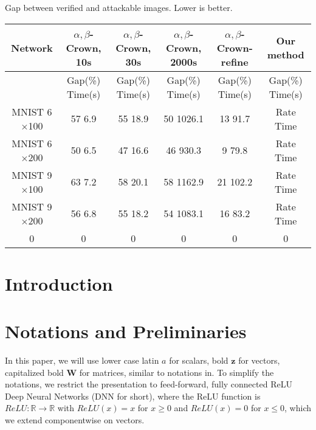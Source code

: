 \documentclass{article} %
\theoremstyle{definition}
\begin{document}
\vspace*{4ex}

Gap between verified and attackable images. Lower is better.

\begin{tabular}{|c|c|c|c|c|c|}
	\hline
	Network & $\alpha,\beta$-Crown, 10s & $\alpha,\beta$-Crown, 30s & $\alpha,\beta$-Crown, 2000s & $\alpha,\beta$-Crown-refine & Our method \\ \hline
	& Gap(\%) \hfill Time(s) & Gap(\%) \hfill Time(s) & Gap(\%) \hfill Time(s) & Gap(\%) \hfill Time(s) & Gap(\%) \hfill Time(s)\\ \hline
	MNIST 6$\times$100 & 57 \hfill 6.9 & 55 \hfill 18.9 & 50 \hfill 1026.1 & 13 \hfill 91.7 & Rate \hfill Time \\ \hline
	MNIST 6$\times$200 & 50 \hfill 6.5 & 47 \hfill 16.6 & 46 \hfill 930.3 & 9 \hfill 79.8 & Rate \hfill Time \\ \hline
	MNIST 9$\times$100 & 63 \hfill 7.2 & 58 \hfill 20.1 & 58 \hfill 1162.9 & 21 \hfill 102.2 & Rate \hfill Time \\ \hline
	MNIST 9$\times$200 & 56 \hfill 6.8 & 55 \hfill 18.2 & 54 \hfill 1083.1 & 16 \hfill 83.2 & Rate \hfill Time \\ \hline
	0 & 0 & 0 & 0 & 0 & 0 \\ \hline
\end{tabular}


	\section{Introduction}


%


\section{Notations and Preliminaries}

In this paper, we will use lower case latin $a$ for scalars, bold $\boldsymbol{z}$ for vectors, 
capitalized bold $\boldsymbol{W}$ for matrices, similar to notations in.
To simplify the notations, we restrict the presentation to feed-forward, 
fully connected ReLU Deep Neural Networks (DNN for short), where the ReLU function is $ReLU : \mathbb{R} \rightarrow \mathbb{R}$ with
$ReLU(x)=x$ for $x \geq 0$ and $ReLU(x)=0$ for $x \leq 0$, which we extend componentwise on vectors.
\end{document}
